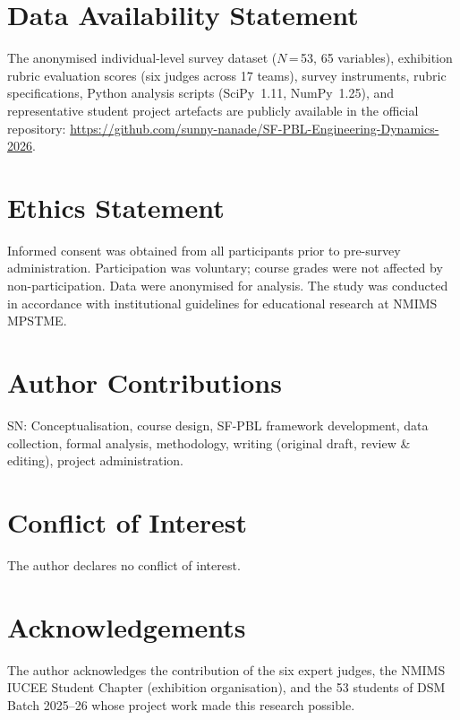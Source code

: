 \documentclass[12pt, a4paper]{article}
\begin{document}
\section*{Data Availability Statement}
The anonymised individual-level survey dataset ($N$\,=\,53, 65 variables),
exhibition rubric evaluation scores (six judges across 17 teams), survey instruments,
rubric specifications, Python analysis scripts (SciPy~1.11, NumPy~1.25), and
representative student project artefacts are publicly available in the official
repository: \url{https://github.com/sunny-nanade/SF-PBL-Engineering-Dynamics-2026}.

\section*{Ethics Statement}

Informed consent was obtained from all participants prior to
pre-survey administration. Participation was voluntary; course
grades were not affected by non-participation. Data were
anonymised for analysis. The study was conducted in accordance
with institutional guidelines for educational research at NMIMS
MPSTME.

\section*{Author Contributions}

SN: Conceptualisation, course design, SF-PBL framework
development, data collection, formal analysis, methodology,
writing (original draft, review \& editing), project
administration.

\section*{Conflict of Interest}

The author declares no conflict of interest.

\section*{Acknowledgements}

The author acknowledges the contribution of the six expert judges,
the NMIMS IUCEE Student Chapter (exhibition organisation), and the
53 students of DSM Batch 2025--26 whose project work made this
research possible.
\end{document}
